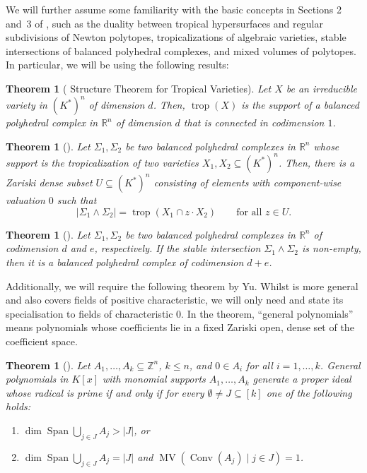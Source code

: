 \documentclass[11pt]{article}
\newtheorem{theorem}[theo]{Theorem}
\theoremstyle{definition}
\numberwithin{equation}{section}
\newcommand{\RR}{\mathbb{R}}
\newcommand{\ZZ}{\mathbb{Z}}
\DeclareMathOperator{\Conv}{Conv}
\DeclareMathOperator{\MV}{MV}
\DeclareMathOperator{\Span}{Span}
\DeclareMathOperator{\trop}{trop}
\begin{document}
We will further assume some familiarity with the basic concepts in Sections 2 and~3 of \cite{MaclaganSturmfels15}, such as the duality between tropical hypersurfaces and regular subdivisions of Newton polytopes, tropicalizations of algebraic varieties, stable intersections of balanced polyhedral complexes, and mixed volumes of polytopes. In particular, we will be using the following results:

\begin{theorem}[{\cite[Theorem 3.3.5]{MaclaganSturmfels15}} Structure Theorem for Tropical Varieties]\label{thm:StructureTheorem}
  Let $X$ be an irreducible variety in $(K^\ast)^n$ of dimension $d$. Then, $\trop(X)$ is the support of a balanced polyhedral complex in $\RR^n$ of dimension $d$ that is connected in codimension $1$.
\end{theorem}

\begin{theorem}[{\cite[Theorem 3.6.1]{MaclaganSturmfels15}}]\label{thm:stableTropicalization}
  Let $\Sigma_1,\Sigma_2$ be two balanced polyhedral complexes in $\RR^n$ whose support is the tropicalization of two varieties $X_1,X_2\subseteq (K^\ast)^n$. Then, there is a Zariski dense subset $U\subseteq (K^\ast)^n$ consisting of elements with component-wise valuation $0$ such that
  \[ |\Sigma_1\wedge\Sigma_2| = \trop(X_1\cap z\cdot X_2) \qquad \text{for all }z\in U. \]
\end{theorem}

\begin{theorem}[{\cite[Theorem 3.6.10]{MaclaganSturmfels15}}]\label{thm:stableIntersection}
  Let $\Sigma_1,\Sigma_2$ be two balanced polyhedral complexes in $\RR^n$ of codimension $d$ and $e$, respectively. If the stable intersection $\Sigma_1\wedge\Sigma_2$ is non-empty, then it is a balanced polyhedral complex of codimension $d+e$.
\end{theorem}

Additionally, we will require the following theorem by Yu. Whilst {\cite[Theorem~3]{Yu16}} is more general and also covers fields of positive characteristic, we will only need and state its specialisation to fields of characteristic $0$. In the theorem, ``general polynomials'' means polynomials whose coefficients lie in a fixed Zariski open, dense set of the coefficient space.

\begin{theorem}[{\cite[Theorem 3]{Yu16}}]\label{thm:Yu}
  Let $A_1,\dots,A_k\subseteq\ZZ^n$, $k\leq n$, and $0\in A_i$ for all $i=1,\dots,k$. General polynomials in $K[x]$ with monomial supports $A_1,\dots,A_k$ generate a proper ideal whose radical is prime if and only if for every $\emptyset\neq J\subseteq [k]$ one of the following holds:
  \begin{enumerate}
  \item\label{enumitem:Yu1} $\dim \Span\bigcup_{j\in J}A_j>|J|$, or
  \item\label{enumitem:Yu2} $\dim \Span\bigcup_{j\in J}A_j=|J|$ and $\MV(\Conv(A_j)\mid j\in J)=1$.
  \end{enumerate}
\end{theorem}
\end{document}
